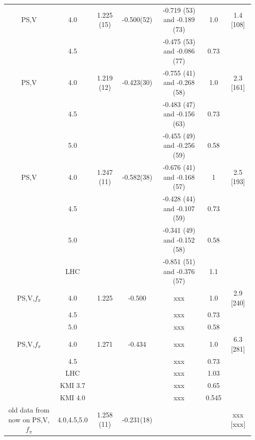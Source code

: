 \documentclass[aps,prl,twocolumn,]{revtex4}  %
\begin{document}
\begin{table}[htdp]
\begin{center}
\begin{tabular}{|c|c|c|c|c|c|c|}
\hline
PS,V&	4.0	& 	1.225 (15)	&	 -0.500(52) &	-0.719 (53) and -0.189 (73)	&	1.0    &	1.4 [108] \\
	&	4.5	&		        &		        &	-0.475 (53)	and -0.086 (77)&	0.73	&	        \\
\hline
PS,V&	4.0	& 	1.219 (12)	&	 -0.423(30) &	-0.755 (41) and -0.268 (58)	&	1.0    &	2.3 [161] \\
	&	4.5	&		        &		        &	-0.483 (47)	and -0.156 (63)&	0.73	&	        \\
	&	5.0	&	        	&       		&	-0.455 (49)	and -0.256 (59)&	0.58	&		        \\
\hline
PS,V&	4.0	& 	1.247 (11)	&	  -0.582(38)&	-0.676 (41) and -0.168 (57)	&	1	    &   2.5 [193] \\
	&	4.5	&		        &			    &	-0.428 (44)	and -0.107 (59)&	0.73   &	 	        \\
	&	5.0	&	        	&       		&	-0.341 (49)	and -0.152 (58)&	0.58	&		        \\
	&	LHC\protect\cite{Fodor:2011tu}	&&	&	-0.851 (51) and -0.376 (57)&	1.1 	& 	 \\
\hline
PS,V,$f_\pi$&	4.0	& 	1.225	&	 -0.500 &   xxx	        &	1.0    &	2.9 [240] \\
	&	4.5	&		        &		        &	xxx         &	0.73	&	        \\
	&	5.0	&	        	&       		&	xxx         &	0.58	&		        \\
\hline
PS,V,$f_\pi$&	4.0	&   1.271	&	 -0.434 &   xxx	        &	1.0    &	6.3 [281] \\
	&	4.5	&		        &		        &	xxx         &	0.73	&	        \\
	&	LHC\protect\cite{Fodor:2011tu}	&&	&	xxx         &	1.03 	& 	 \\
	&	KMI 3.7\protect\cite{Aoki:2012eq}&& &	xxx	        &	0.65 &	 	 \\
	&	KMI 4.0\protect\cite{Aoki:2012eq}&&	&	xxx	        &	0.545 &	\\
\hline
old data from now on PS,V,$f_\pi$	&	4.0,4.5,5.0	& 1.258 (11)	&	-0.231(18)  	&		&		&	xxx [xxx]	\\

\end{tabular}
\end{center}
\end{table}
\end{document}
